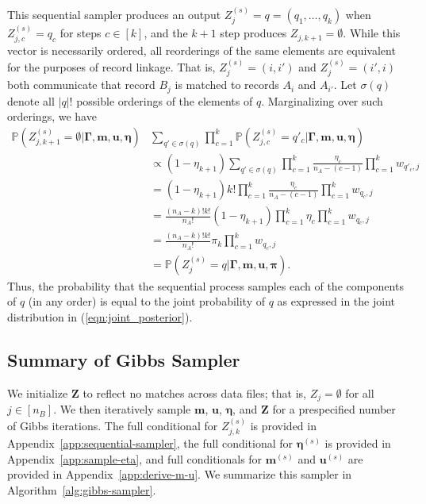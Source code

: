 \documentclass[12pt,letterpaper]{article}
\newcommand{\1}[1]{\mathbb{I}\!\left[#1\right]} %
\begin{document}
This sequential sampler produces an output $Z_j^{(s)} = q = (q_1, \ldots, q_k)$ when $Z_{j, c}^{(s)} = q_c$ for steps $c \in [k]$, and the $k+1$ step produces $Z_{j, k+1} = \emptyset$. While this vector is necessarily ordered, all reorderings of the same elements are equivalent for the purposes of record linkage.   That is, $Z_j^{(s)} = (i, i')$ and $Z_j^{(s)} = (i', i)$ both communicate that record $B_j$ is matched to records $A_i$ and $A_{i'}$. Let $\sigma(q)$ denote all $|q|!$ possible orderings of the elements of $q$. Marginalizing over such orderings, we have
\begin{align*}
	\mathbb{P}(Z_{j, k+1}^{(s)} = \emptyset | \bm{\Gamma}, \bm{m}, \bm{u}, \bm{\eta}) &\sum_{q' \in \sigma(q)} \prod_{c = 1}^{k} \mathbb{P}(Z_{j, c}^{(s)} = q'_c|\bm{\Gamma}, \bm{m}, \bm{u}, \bm{\eta}) \\
	&\propto (1 - \eta_{k+1}) \sum_{q' \in \sigma(q)} \prod_{c = 1}^{k} \frac{\eta_{c} }{n_A - (c - 1)}  \prod_{c = 1}^{k} w_{q'_c, j} \\
	&=(1 - \eta_{k+1}) k! \prod_{c = 1}^{k} \frac{\eta_{c} }{n_A - (c - 1)}  \prod_{c = 1}^{k} w_{q_c, j} \\
	&= \frac{(n_A - k)!k!}{n_A!} (1 - \eta_{k+1})\prod_{c = 1}^{k} \eta_{c} \prod_{c = 1}^{k} w_{q_c, j} \\
	&= \frac{(n_A - k)!k!}{n_A!} \pi_k \prod_{c = 1}^{k} w_{q_c, j} \\
	&= \mathbb{P}\left(Z_j^{(s)}  = q |\bm{\Gamma}, \bm{m}, \bm{u}, \bm{\pi}\right).
\end{align*}
Thus, the probability that the sequential process samples each of the components of $q$ (in any order) is equal to the joint probability of $q$ as expressed in the joint distribution in (\ref{eqn:joint_posterior}).


\subsection{Summary of Gibbs Sampler}\label{sec:gibbs-sampler}

We initialize $\bm{Z}$ to reflect no matches across data files; that is, $Z_j = \emptyset$ for all $j \in [n_B]$. We then iteratively sample $\bm{m}$,  $\bm{u}$, $\bm{\eta}$, and $\bm{Z}$ for a prespecified number of Gibbs iterations. The full conditional for $Z_{j, k}^{(s)}$ is provided in Appendix~\ref{app:sequential-sampler}, the full conditional for $\bm{\eta}^{(s)}$ is provided in Appendix~\ref{app:sample-eta}, and full conditionals for $\bm{m}^{(s)}$ and $\bm{u}^{(s)}$ are provided in Appendix~\ref{app:derive-m-u}. We summarize this sampler in Algorithm~\ref{alg:gibbs-sampler}.
\end{document}
